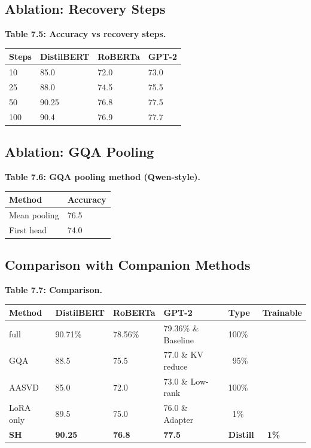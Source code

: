 \subsection{Ablation: Recovery Steps}

\textbf{Table 7.5: Accuracy vs recovery steps.}

\begin{table}[H]
\centering
\small
\begin{tabular}{llll}
\toprule
\textbf{Steps} & \textbf{DistilBERT} & \textbf{RoBERTa} & \textbf{GPT-2} \\
\midrule
10 & 85.0 & 72.0 & 73.0 \\
25 & 88.0 & 74.5 & 75.5 \\
50 & 90.25 & 76.8 & 77.5 \\
100 & 90.4 & 76.9 & 77.7 \\
\bottomrule
\end{tabular}
\end{table}

\subsection{Ablation: GQA Pooling}

\textbf{Table 7.6: GQA pooling method (Qwen-style).}

\begin{table}[H]
\centering
\small
\begin{tabular}{ll}
\toprule
\textbf{Method} & \textbf{Accuracy} \\
\midrule
Mean pooling & 76.5 \\
First head & 74.0 \\
\bottomrule
\end{tabular}
\end{table}

\subsection{Comparison with Companion Methods}

\textbf{Table 7.7: Comparison.}

\begin{table}[H]
\centering
\small
\begin{tabular}{llllll}
\toprule
\textbf{Method} & \textbf{DistilBERT} & \textbf{RoBERTa} & \textbf{GPT-2} & \textbf{Type} & \textbf{Trainable} \\
\midrule
full & 90.71\% & 78.56\% & 79.36\% \& Baseline & 100\% \\
GQA & 88.5 & 75.5 & 77.0 \& KV reduce & ~95\% \\
AASVD & 85.0 & 72.0 & 73.0 \& Low-rank & 100\% \\
LoRA only & 89.5 & 75.0 & 76.0 \& Adapter & ~1\% \\
\textbf{SH} & \textbf{90.25} & \textbf{76.8} & \textbf{77.5} & \textbf{Distill} & \textbf{~1\%} \\
\bottomrule
\end{tabular}
\end{table}

